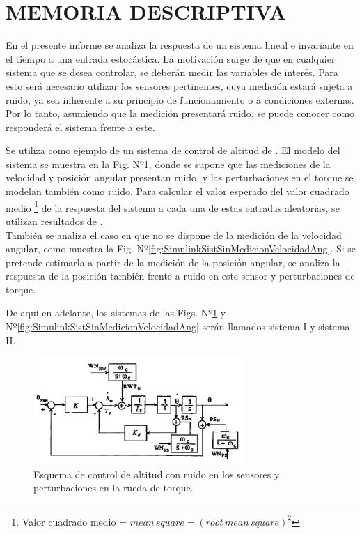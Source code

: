 \documentclass[a4paper,11pt,twoside]{IT-CNEA}
\begin{document}
    \tableofcontents       
    \printnomenclature[2cm]

\newpage  
\section{MEMORIA DESCRIPTIVA}
En el presente informe se analiza la respuesta de un sistema lineal e invariante en el tiempo a una entrada estocástica. La motivación surge de que en cualquier sistema que se desea controlar, se deberán medir las variables de interés. Para esto será necesario utilizar los sensores pertinentes, cuya medición estará sujeta a ruido, ya sea inherente a su principio de funcionamiento o a condiciones externas. Por lo tanto, asumiendo que la medición presentará ruido, se puede conocer como responderá el sistema frente a este. 
\par Se utiliza como ejemplo de un sistema de control de altitud de \cite{Sidi}. El modelo del sistema se muestra en la Fig. Nº\ref{fig:ModeloControlAltitudSidi}, donde se supone que las mediciones de la velocidad y posición angular presentan ruido, y las perturbaciones en el torque se modelan también como ruido. Para calcular el valor esperado del valor cuadrado medio \footnote{Valor cuadrado medio = $mean\,square=(root\,mean\,square)^2$} de la respuesta del sistema a cada una de estas entradas aleatorias, se utilizan resultados de \cite{Grover}.
\\También se analiza el caso en que no se dispone de la medición de la velocidad angular, como muestra la Fig. Nº\ref{fig:SimulinkSistSinMedicionVelocidadAng}. Si se pretende estimarla a partir de la medición de la posición angular, se analiza la respuesta de la posición también frente a ruido en este sensor y perturbaciones de torque. 
\par De aquí en adelante, los sistemas de las Figs. Nº\ref{fig:ModeloControlAltitudSidi} y Nº\ref{fig:SimulinkSistSinMedicionVelocidadAng} serán llamados sistema I y sistema II. 
\begin{figure}[h!]
\centering
\includegraphics[width=8cm]{Figuras/ModeloControlAltitudSidi.png}
\caption{Esquema de control de altitud con ruido en los sensores y perturbaciones en la rueda de torque.}
\label{fig:ModeloControlAltitudSidi}
\end{figure}
\end{document}
